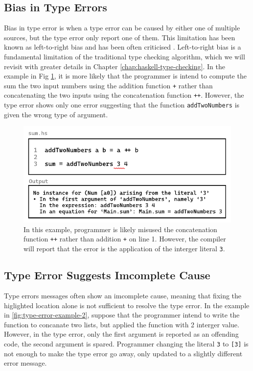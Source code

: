  \subsection{Bias in Type Errors} 
 \label{subsec:bias}
 Bias in type error is when a type error can be caused by either one of multiple sources, but the type error only report one of them. This limitation has been known as left-to-right bias and has been often criticised \cite{McAdam2002-vb, Lee1998-fx, Chen2014-ev}. Left-to-right bias is a fundamental limitation of the traditional type checking algorithm, which we will revisit with greater details in Chapter \ref{chap:haskell-type-checking}. In the example in Fig \ref{fig:type-error-example}, it is more likely that the programmer is intend to compute the sum the two input numbers using the addition function \texttt{+} rather than concatenating the two inputs using the concatenation function \texttt{++}. However, the type error shows only one error suggesting that the function \texttt{addTwoNumbers} is given the wrong type of argument. 

 \begin{figure}[hbt]
  \includegraphics[width=\linewidth]{TypeErrorExample}
  \caption{
    \label{fig:type-error-example}
  In this example, programmer is likely misused the concatenation function \texttt{++} rather than addition \texttt{+} on line 1. However, the compiler will report that the error is the application of the interger literal \texttt{3}.
    }
\end{figure}


\subsection{Type Error Suggests Imcomplete Cause}
\label{subsec:imcomplete}

Type errors messages often show an imcomplete cause, meaning that fixing the higlighted location alone is not sufficient to resolve the type error. In the example in \ref{fig:type-error-example-2}, suppose that the programmer intend to write the function to concanate two lists, but applied the function with 2 interger value. However, in the type error, only the first argument is reported as an offending code, the second argument is spared. Programmer changing the literal \texttt{3} to \texttt{[3]} is not enough to make the type error go away, only updated to a slightly different error message. 


